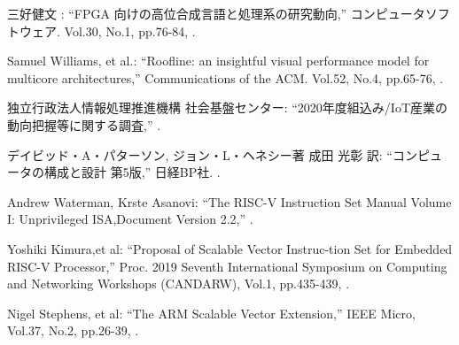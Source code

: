 {\small 三好健文 : %
\newblock ``FPGA 向けの高位合成言語と処理系の研究動向,''
\newblock コンピュータソフトウェア. 
\newblock Vol.30,
\newblock No.1,
\newblock pp.76-84,
.}

{\small Samuel Williams, et al.: %
\newblock ``Roofline: an insightful visual performance model for multicore architectures,''
\newblock Communications of the ACM. 
\newblock Vol.52,
\newblock No.4,
\newblock pp.65-76,
.}

{\small 独立行政法人情報処理推進機構 社会基盤センター: %
\newblock ``2020年度組込み/IoT産業の動向把握等に関する調査,''
.}

{\small デイビッド・A・パターソン, ジョン・L・ヘネシー著 成田 光彰 訳: %
\newblock ``コンピュータの構成と設計 第5版,''
\newblock 日経BP社. 
.}

{\small Andrew Waterman, Krste Asanovi:      %
\newblock ``The RISC-V Instruction Set Manual Volume I: Unprivileged ISA,Document Version 2.2,''
.}

{\small Yoshiki Kimura,et al:      %
\newblock ``Proposal of Scalable Vector Instruc-tion Set for Embedded RISC-V Processor,''
\newblock Proc. 2019 Seventh International Symposium on Computing and Networking Workshops (CANDARW),
\newblock Vol.1,
\newblock pp.435-439,
.}

{\small Nigel Stephens, et al:      %
\newblock ``The ARM Scalable Vector Extension,''
\newblock IEEE Micro,
\newblock Vol.37,
\newblock No.2,
\newblock pp.26-39,
.}